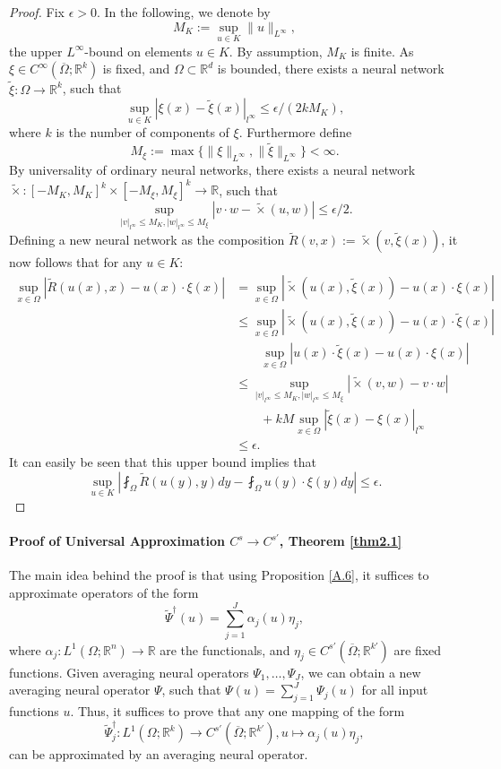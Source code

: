\documentclass[reqno,9pt]{amsart}
\theoremstyle{plain}
\theoremstyle{definition}
\newcommand{\bb}[1]{\mathbb{#1}}
\begin{document}
\begin{proof}
    Fix $\epsilon > 0$. In the following, we denote by
    $$ M_K := \sup_{u\in K}\|u\|_{L^\infty},$$
    the upper $L^\infty$-bound on elements $u \in K$. By assumption, $M_K$ is finite. As $\xi \in C^\infty(\overline{\Omega};\bb R^k)$ is fixed, and $\Omega \subset \bb R^d$ is bounded, there exists a neural network $\tilde{\xi}: \Omega \to \bb R^k$, such that 
    $$ \sup_{u \in K}|\xi(x) - \tilde{\xi}(x)|_{l^\infty} \leq \epsilon/(2kM_K),$$
    where $k$ is the number of components of $\xi$. Furthermore define
    $$ M_{\xi} := \max\{\|\xi\|_{L^\infty}, \|\tilde{\xi}\|_{L^\infty}\} < \infty.$$
    By universality of ordinary neural networks, there exists a neural network $\tilde{\times} : [-M_K,M_K]^k \times [-M_\xi,M_\xi]^k \to \bb R$, such that
    $$ \sup_{|v|_{l^\infty}\leq M_K,|w|_{l^\infty}\leq M_\xi} |v\cdot w - \tilde{\times}(u,w)| \leq \epsilon/2.$$
    Defining a new neural network as the composition $\tilde{R}(v,x):= \tilde{\times}(v,\tilde{\xi}(x))$, it now follows that for any $u \in K$: 
    $$
    \begin{aligned}
        \sup_{x\in \Omega}|\tilde{R}(u(x),x) - u(x)\cdot\xi(x)| &= \sup_{x\in \Omega} |\tilde{\times}(u(x),\tilde{\xi}(x)) - u(x) \cdot \xi(x)| \\
        &\leq \sup_{x\in \Omega}|\tilde{\times}(u(x), \tilde{\xi}(x)) - u(x)\cdot \tilde{\xi}(x)| \\
        &\qquad \sup_{x\in \Omega}|u(x) \cdot \tilde{\xi}(x) - u(x) \cdot \xi(x)|\\
        &\leq \sup_{|v|_{l^\infty}\leq M_K,|w|_{l^\infty}\leq M_\xi} |\tilde{\times}(v,w) - v \cdot w| \\
        &\qquad +kM \sup_{x \in \Omega}|\tilde{\xi}(x) - \xi(x)|_{l^\infty} \\
        &\leq \epsilon.
    \end{aligned}
    $$
    It can easily be seen that this upper bound implies that
    $$ \sup_{u \in K}\left|\fint_{\Omega}\tilde{R}(u(y),y) dy - \fint_{\Omega}u(y)\cdot \xi(y) dy \right| \leq \epsilon.$$
\end{proof}

\paragraph{\bf Proof of Universal Approximation $C^s \to C^{s'}$, Theorem \ref{thm2.1}}The main idea behind the proof is that using Proposition \ref{A.6}, it suffices to approximate operators of the form
$$ \tilde{\Psi}^\dag(u) = \sum_{j=1}^{J} \alpha_j(u)\eta_j,$$
where $\alpha_j : L^1(\Omega; \bb R^n) \to \bb R$ are the functionals, and $\eta_j \in C^{s'}(\overline{\Omega};\bb R^{k'})$ are fixed functions. Given averaging neural operators $\Psi_1, \dots, \Psi_J$, we can obtain a new averaging neural operator $\Psi$, such that $\Psi(u) = \sum_{j=1}^{J}\Psi_j(u)$ for all input functions $u$. Thus, it suffices to prove that any one mapping of the form 
$$ \tilde{\Psi}_j^\dag : L^1(\Omega;\bb R^k) \to C^{s'}(\overline{\Omega};\bb R^{k'}), u \mapsto \alpha_j (u) \eta_j,$$
can be approximated by an averaging neural operator.
\end{document}
